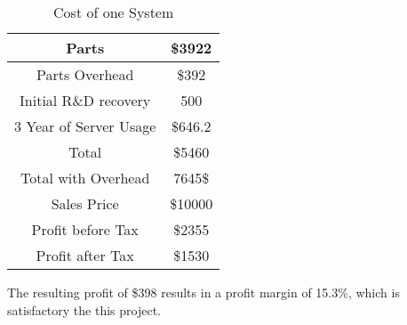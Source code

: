 \documentclass[PPFS.tex]{template/subfiles}
\begin{document}
        \begin{table}[h!]
        	\begin{center}
        		\caption{Cost of one System}
        		\begin{tabular}{|c|c|}
        			\hline
        			Parts & \$3922\\
        			\hline
        			Parts Overhead & \$392\\
        			\hline
        			Initial R\&D recovery & 500\\
        			\hline
        			3 Year of Server Usage & \$646.2\\
        			\hline
        			Total & \$5460\\
        			\hline
        			Total with Overhead & 7645\$\\
        			\hline
        			Sales Price& \$10000\\
        			\hline
        			Profit before Tax& \$2355\\
        			\hline
        			Profit after Tax& \$1530\\
        			\hline
        		\end{tabular}
        	\end{center}
        \end{table}
        
        The resulting profit of \$398 results in a profit margin of 15.3\%, which is satisfactory the this project.
        
        
\end{document}
